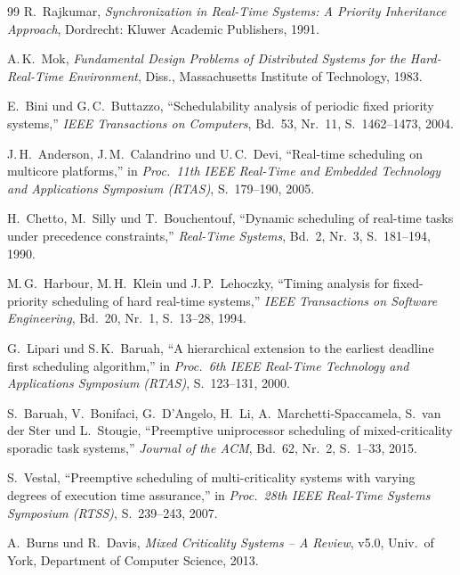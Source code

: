 ﻿\documentclass[a4paper,12pt]{article}
\theoremstyle{definition}
\begin{document}
\begin{thebibliography}{99}
		R.\ Rajkumar,
		\textit{Synchronization in Real-Time Systems: A Priority Inheritance Approach},
		Dordrecht: Kluwer Academic Publishers, 1991.

		A.\,K.\ Mok,
		\textit{Fundamental Design Problems of Distributed Systems for the Hard-Real-Time Environment},
		Diss., Massachusetts Institute of Technology, 1983.

		E.\ Bini und G.\,C.\ Buttazzo,
		``Schedulability analysis of periodic fixed priority systems,''
		\textit{IEEE Transactions on Computers}, Bd.~53, Nr.~11, S.~1462--1473, 2004.

		J.\,H.\ Anderson, J.\,M.\ Calandrino und U.\,C.\ Devi,
		``Real-time scheduling on multicore platforms,''
		in \textit{Proc.\ 11th IEEE Real-Time and Embedded Technology and Applications Symposium (RTAS)},
		S.~179--190, 2005.

		H.\ Chetto, M.\ Silly und T.\ Bouchentouf,
		``Dynamic scheduling of real-time tasks under precedence constraints,''
		\textit{Real-Time Systems}, Bd.~2, Nr.~3, S.~181--194, 1990.

		M.\,G.\ Harbour, M.\,H.\ Klein und J.\,P.\ Lehoczky,
		``Timing analysis for fixed-priority scheduling of hard real-time systems,''
		\textit{IEEE Transactions on Software Engineering}, Bd.~20, Nr.~1, S.~13--28, 1994.

		G.\ Lipari und S.\,K.\ Baruah,
		``A hierarchical extension to the earliest deadline first scheduling algorithm,''
		in \textit{Proc.\ 6th IEEE Real-Time Technology and Applications Symposium (RTAS)},
		S.~123--131, 2000.

		S.\ Baruah, V.\ Bonifaci, G.\ D'Angelo, H.\ Li, A.\ Marchetti-Spaccamela,
		S.\ van der Ster und L.\ Stougie,
		``Preemptive uniprocessor scheduling of mixed-criticality sporadic task systems,''
		\textit{Journal of the ACM}, Bd.~62, Nr.~2, S.~1--33, 2015.

		S.\ Vestal,
		``Preemptive scheduling of multi-criticality systems with varying degrees of
		execution time assurance,''
		in \textit{Proc.\ 28th IEEE Real-Time Systems Symposium (RTSS)}, S.~239--243, 2007.

		A.\ Burns und R.\ Davis,
		\textit{Mixed Criticality Systems -- A Review},
		v5.0, Univ.\ of York, Department of Computer Science, 2013.

	\end{thebibliography}
	
\end{document}
